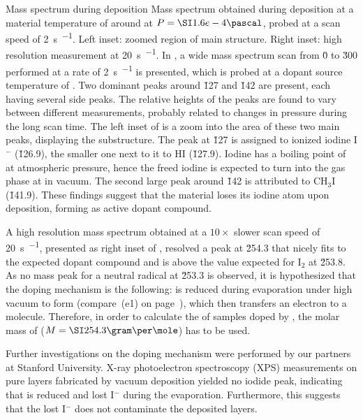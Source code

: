 %
{Mass spectrum during \meodmbiI deposition}
{Mass spectrum obtained during \meodmbiI deposition at a material temperature of around  at $\druck=\pa{1.6e-4}$, probed at a scan speed of \SI{2}{\second\per\atomicmass}. Left inset: zoomed region of main structure. Right inset: high resolution measurement at \SI{20}{\second\per\atomicmass}.}
%
%
In , a wide mass spectrum scan from \u{0} to \u{300} performed at a rate of \SI{2}{\second\per\atomicmass} is presented, which is probed at a dopant source temperature of .
Two dominant peaks around \u{127} and \u{142} are present, each having several side peaks. The relative heights of the peaks are found to vary between different measurements, probably related to changes in pressure during the long scan time.
The left inset of  is a zoom into the area of these two main peaks, displaying the substructure.
The peak at \u{127} is assigned to ionized iodine I$^-$ (\u{126.9}), the smaller one next to it to HI (\u{127.9}). Iodine has a boiling point of  at atmospheric pressure, hence the freed iodine is expected to turn into the gas phase at  in vacuum. The second large peak around \u{142} is attributed to CH$_3$I (\u{141.9}). These findings suggest that the material \meodmbiI loses its iodine atom upon deposition, forming \meodmbi as active dopant compound.

A high resolution mass spectrum obtained at a $10\times$ slower scan speed of \SI{20}{\second\per\atomicmass}, presented as right inset of , resolved a peak at \u{254.3} that nicely fits to the expected dopant compound \meodmbi and is above the value expected for I$_2$ at \u{253.8}.
As no mass peak for a neutral radical at \u{253.3} is observed, it is hypothesized that the doping mechanism is the following: \meodmbiI is reduced during evaporation under high vacuum to form \meodmbi (compare \,(e1) on page~\pageref{fig:mat}), which then transfers an electron to a \CS molecule.
Therefore, in order to calculate the \CLong of samples doped by \meodmbiI, the molar mass of \meodmbi ($\MM=\gMole{254.3}$) has to be used.

Further investigations on the doping mechanism were performed by our partners at Stanford University. X-ray photoelectron spectroscopy (XPS) measurements on pure \meodmbiI layers fabricated by vacuum deposition yielded no iodide peak, indicating that \meodmbiI is reduced and lost I$^-$ during the evaporation. Furthermore, this suggests that the lost I$^-$ does not contaminate the deposited layers.\cite{Wei2012}

